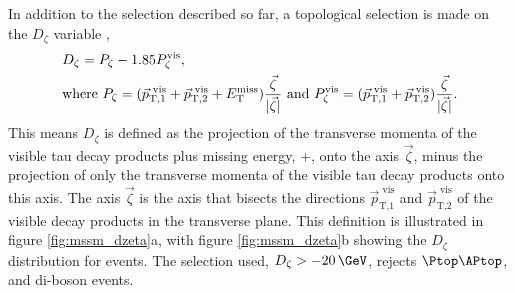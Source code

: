 In addition to the selection described so far,
 a topological selection is made on the $D_{\zeta}$ variable \cite{cdf-dzeta},
\begin{align}\label{eqn:mssm_em_dzeta}
&D_{\zeta} = P_{\zeta} - 1.85 P_{\zeta}^{\text{vis}}, \notag \\
&\text{where } P_{\zeta} = (\vec{p}_{\text{T},1}^{\text{  vis}} + \vec{p}_{\text{T},2}^{\text{  vis}} + E_{\text{T}}^{\text{miss}})\frac{\vec{\zeta}}{|\vec{\zeta}|} 
\text{ and } P_{\zeta}^{\text{vis}} = (\vec{p}_{\text{T},1}^{\text{  vis}}+\vec{p}_{\text{T},2}^{\text{  vis}})\frac{\vec{\zeta}}{|\vec{\zeta}|}.
\end{align}
This means $D_{\zeta}$ is defined as the projection of the transverse momenta of the visible tau decay products plus missing energy, \pT+\MET, onto 
the axis $\vec{\zeta}$, minus the projection of only the transverse momenta of the visible tau decay products onto this axis.
The axis $\vec{\zeta}$ is the axis that bisects
the directions $\vec{p}_{\text{T,1}}^{\text{  vis}}$ and $\vec{p}_{\text{T,2}}^{\text{  vis}}$
of the visible decay products in the transverse plane. This definition is illustrated in figure
\ref{fig:mssm_dzeta}a, with figure \ref{fig:mssm_dzeta}b showing the $D_{\zeta}$ distribution
for \emu events. The selection used, $D_{\zeta} > -20\,\GeV$, rejects $\ttbar$, \Wjets and di-boson
events. 


